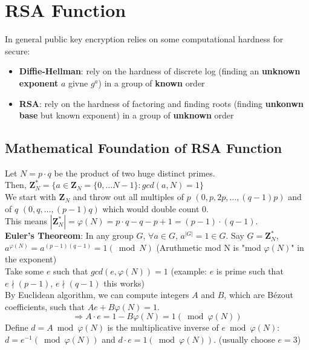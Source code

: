 \documentclass{scribe}
\begin{document}
\maketitle


\section{RSA Function}
In general public key encryption relies on some computational hardness for secure:
\begin{itemize}
    \item \textbf{Diffie-Hellman}: rely on the hardness of discrete log (finding an \textbf{unknown exponent} $a$ givne $g^a$) in a group of \textbf{known} order
    \item \textbf{RSA}: rely on the hardness of factoring and finding roots (finding \textbf{unkonwn base} but known exponent) in a group of \textbf{unknown} order
\end{itemize}

\subsection{Mathematical Foundation of RSA Function}
Let $N = p \cdot q$ be the product of two huge distinct primes.
\\
Then, $\mathbf{Z}_N^* = \{a \in \mathbf{Z}_N = \{0, \dots N-1\}: gcd(a,N) =1\}$
\\
We start with $\mathbf{Z}_N$ and throw out all multiples of $p$ $(0,p,2p, \dots , (q-1)p)$ and of $q$ $(0,q, \dots, (p-1)q)$ which would double count 0. 
\\
This means $|\mathbf{Z}_N^*| = \varphi(N) = p \cdot q - q -p +1 = (p-1)\cdot (q-1)$.
\\
\textbf{Euler's Theoreom}: In any group $G$, $\forall  a \in G$, $a^{|G|} = 1 \in G$. 
Say $G = \mathbf{Z}_N^*$, $a^{\varphi(N)}=a^{(p-1)(q-1)} = 1 (\bmod N)$ 
(Aruthmetic  mod N is "mod $\varphi(N)$" in the exponent)
\\
Take some $e$ such that $gcd(e,\varphi(N)) = 1$ (example: $e$ is prime such that $e \nmid (p-1)$, $e \nmid (q-1)$ this works)
\\
By Euclidean algorithm, we can compute integers $A$ and $B$, which are B\'{e}zout coefficients, such that $Ae+B\varphi(N) = 1$.
\\
\[\Rightarrow A \cdot e = 1 - B \varphi(N) = 1 (\bmod \varphi(N))\]
Define $d = A \bmod \varphi(N)$ is the multiplicative inverse of $e \bmod \varphi(N)$: $d=e^{-1} (\bmod \varphi(N))$ and $d \cdot e = 1 (\bmod \varphi(N))$. (usually choose $e=3$)
\vspace{10mm}
\end{document}

